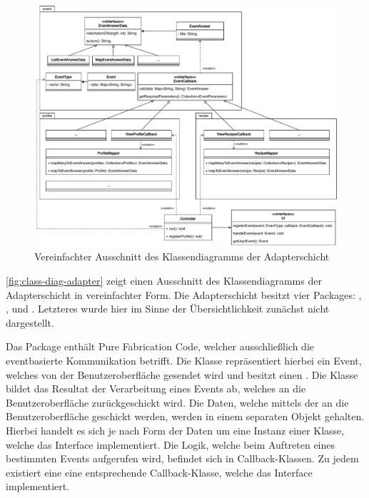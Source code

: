 \begin{figure}[ht!]
    \includegraphics[width=0.98\columnwidth]{../diagrams/adapter_uml.pdf}
    \caption{Vereinfachter Ausschnitt des Klassendiagramms der Adapterschicht}
    \label{fig:class-diag-adapter}
\end{figure}

\autoref{fig:class-diag-adapter} zeigt einen Ausschnitt des Klassendiagramms der Adapterschicht in vereinfachter Form. Die Adapterschicht besitzt vier Packages: , ,  und . Letzteres wurde hier im Sinne der Übersichtlichkeit zunächst nicht dargestellt. 

Das Package  enthält Pure Fabrication Code, welcher ausschließlich die eventbasierte Kommunikation betrifft. Die Klasse  repräsentiert hierbei ein Event, welches von der Benutzeroberfläche gesendet wird und besitzt einen . Die Klasse  bildet das Resultat der Verarbeitung eines Events ab, welches an die Benutzeroberfläche zurückgeschickt wird. Die Daten, welche mittels der  an die Benutzeroberfläche geschickt werden, werden in einem separaten Objekt gehalten. Hierbei handelt es sich je nach Form der Daten um eine Instanz einer Klasse, welche das Interface  implementiert. Die Logik, welche beim Auftreten eines bestimmten Events aufgerufen wird, befindet sich in Callback-Klassen. Zu jedem  existiert eine eine entsprechende Callback-Klasse, welche das Interface  implementiert.

